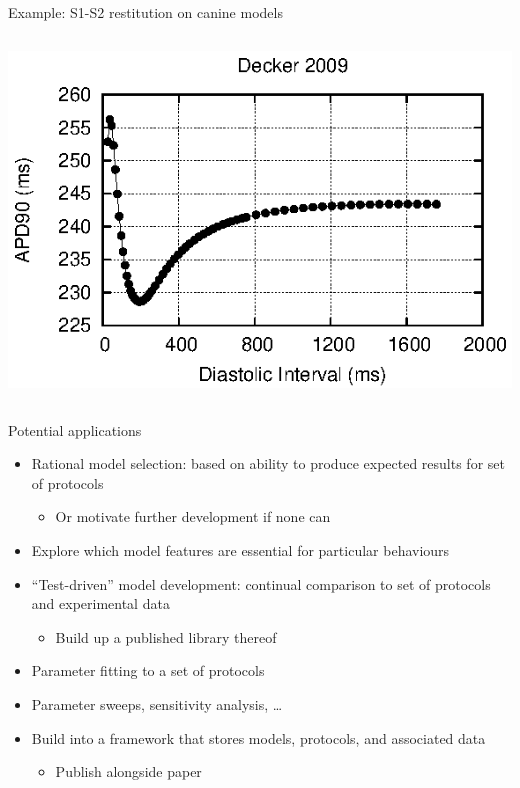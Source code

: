 \documentclass[t,xcolor={usenames,dvipsnames}]{beamer}
\newcommand{\subitem}[1]{\begin{itemize}\item #1 \end{itemize}}
\begin{document}
\begin{frame}{Example: S1-S2 restitution on canine models}
\begin{columns}[T]
\begin{column}{.33\linewidth}
\begin{center}
\vspace{.1cm}
\includegraphics[width=\textwidth]{decker_2009_s1s2_curve}
\end{center}
\end{column}
\end{columns}
\end{frame}


\begin{frame}{Potential applications}
\begin{itemize}
\item Rational model selection: based on ability to produce expected results for set of protocols
  \subitem{Or motivate further development if none can}
\item Explore which model features are essential for particular behaviours
\item ``Test-driven'' model development: continual comparison to set of protocols and experimental data
  \subitem{Build up a published library thereof}
\item Parameter fitting to a set of protocols
\item Parameter sweeps, sensitivity analysis, \ldots
\item Build into a framework that stores models, protocols, and associated data
  \subitem{Publish alongside paper}
\end{itemize}
\end{frame}
\end{document}
